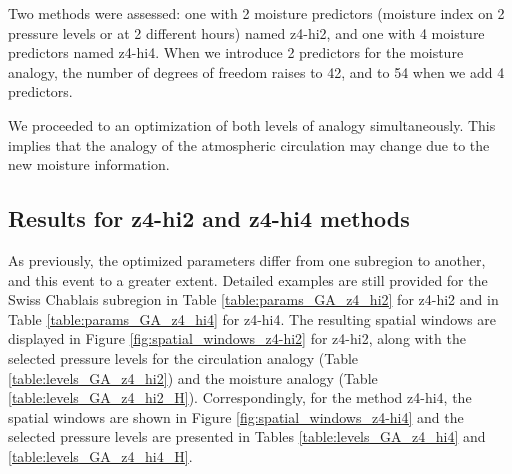 \documentclass[5p]{elsarticle}
\begin{document}
Two methods were assessed: one with 2 moisture predictors (moisture index on 2 pressure levels or at 2 different hours) named z4-hi2, and one with 4 moisture predictors named z4-hi4. When we introduce 2 predictors for the moisture analogy, the number of degrees of freedom raises to 42, and to 54 when we add 4 predictors.

We proceeded to an optimization of both levels of analogy simultaneously. This implies that the analogy of the atmospheric circulation may change due to the new moisture information.


\subsection{Results for z4-hi2 and z4-hi4 methods}

As previously, the optimized parameters differ from one subregion to another, and this event to a greater extent. Detailed examples are still provided for the Swiss Chablais subregion in Table \ref{table:params_GA_z4_hi2} for z4-hi2 and in Table \ref{table:params_GA_z4_hi4} for z4-hi4. The resulting spatial windows are displayed in Figure \ref{fig:spatial_windows_z4-hi2} for z4-hi2, along with the selected pressure levels for the circulation analogy (Table \ref{table:levels_GA_z4_hi2}) and the moisture analogy (Table \ref{table:levels_GA_z4_hi2_H}). Correspondingly, for the method z4-hi4, the spatial windows are shown in Figure \ref{fig:spatial_windows_z4-hi4} and the selected pressure levels are presented in Tables \ref{table:levels_GA_z4_hi4} and \ref{table:levels_GA_z4_hi4_H}.
\end{document}
